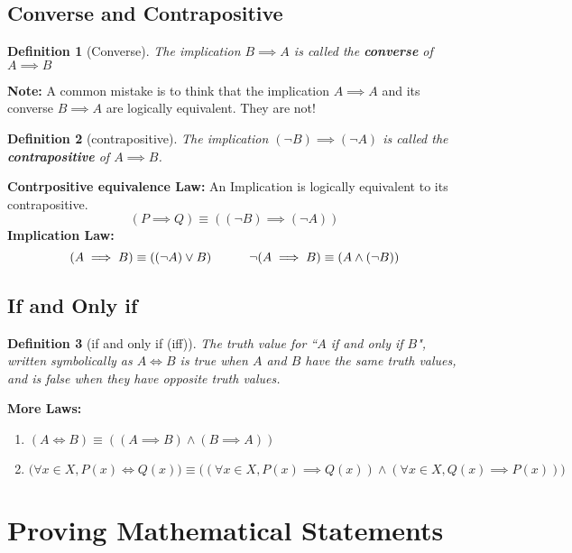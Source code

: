 \documentclass[10pt]{article}
\theoremstyle{break}
\newtheorem{defn}{Definition}[subsection]
\begin{document}
\subsection{Converse and Contrapositive}
\begin{defn}[Converse]
    The implication $B \implies A$ is called the \textbf{converse} of $A \implies B$
\end{defn}
\textbf{Note: }A common mistake is to think that the implication $A \implies A$ and its converse $B \implies A$ are logically equivalent. They are not!
\begin{defn}[contrapositive]
    The implication $(\neg B) \implies (\neg A)$ is called the \textbf{contrapositive} of $A \implies B$.
\end{defn}
\textbf{Contrpositive equivalence Law:} An Implication is logically equivalent to its contrapositive. $$(P \implies Q) \equiv ((\neg B) \implies (\neg A))$$
\textbf{Implication Law:} $$(A \implies B) \equiv ((\neg A) \vee B) \hspace{7ex} \neg(A \implies B) \equiv (A \wedge (\neg B))$$

\subsection{If and Only if}
\begin{defn}[if and only if (iff)]
    The truth value for “$A$ if and only if $B$", written symbolically as $A \iff B$ is true when $A$ and $B$ have the 
    same truth values, and is false when they have opposite truth values.
\end{defn}
\textbf{More Laws:} 
\begin{enumerate}
    \item $(A \iff B) \equiv ((A \implies B) \wedge (B \implies A))$
    \item $\big(\forall x \in X, P(x) \iff Q(x)\big) \equiv \big((\forall x \in X, P(x) \implies Q(x)) \wedge (\forall x \in X, Q(x) \implies P(x))\big)$
\end{enumerate}

\section{Proving Mathematical Statements}
\end{document}
